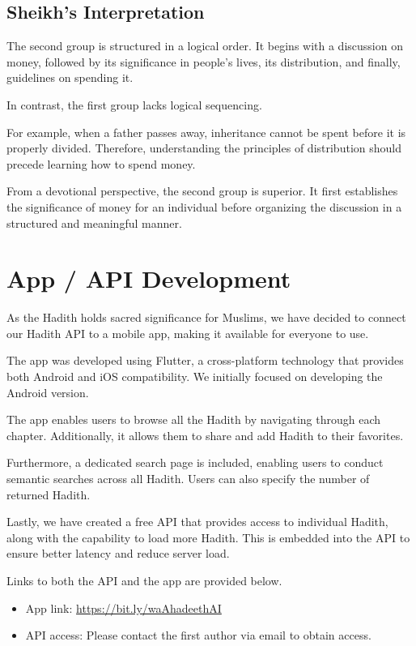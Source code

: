 \documentclass{svproc}
\begin{document}
\subsection*{Sheikh's Interpretation}
The second group is structured in a logical order. It begins with a discussion on money, followed by its significance in people’s lives, its distribution, and finally, guidelines on spending it.

In contrast, the first group lacks logical sequencing.

For example, when a father passes away, inheritance cannot be spent before it is properly divided. Therefore, understanding the principles of distribution should precede learning how to spend money.

From a devotional perspective, the second group is superior. It first establishes the significance of money for an individual before organizing the discussion in a structured and meaningful manner.






\section{App / API Development}

As the Hadith holds sacred significance for Muslims, we have decided to connect our Hadith API to a mobile app, making it available for everyone to use.

The app was developed using Flutter, a cross-platform technology that provides both Android and iOS compatibility. We initially focused on developing the Android version.

The app enables users to browse all the Hadith by navigating through each chapter. Additionally, it allows them to share and add Hadith to their favorites.

Furthermore, a dedicated search page is included, enabling users to conduct semantic searches across all Hadith. Users can also specify the number of returned Hadith.

Lastly, we have created a free API that provides access to individual Hadith, along with the capability to load more Hadith. This is embedded into the API to ensure better latency and reduce server load.

Links to both the API and the app are provided below.
\begin{itemize}
    \item App link: \url{https://bit.ly/waAhadeethAI}
    \item API access: Please contact the first author via email to obtain access.
\end{itemize}
\end{document}
